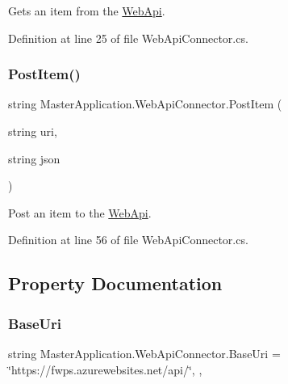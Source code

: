 Gets an item from the \mbox{\hyperlink{namespace_web_api}{Web\+Api}}. 



Definition at line 25 of file Web\+Api\+Connector.\+cs.

\mbox{\label{class_master_application_1_1_web_api_connector_aa75d6d9b09024ecdafe0c5b2b5911505}} 
\subsubsection{\texorpdfstring{Post\+Item()}{PostItem()}}
{\footnotesize\ttfamily string Master\+Application.\+Web\+Api\+Connector.\+Post\+Item (\begin{DoxyParamCaption}\item[{string}]{uri,  }\item[{string}]{json }\end{DoxyParamCaption})}



Post an item to the \mbox{\hyperlink{namespace_web_api}{Web\+Api}}. 



Definition at line 56 of file Web\+Api\+Connector.\+cs.



\subsection{Property Documentation}
\mbox{\label{class_master_application_1_1_web_api_connector_adada9c227fb19e053af688062d548010}} 
\subsubsection{\texorpdfstring{Base\+Uri}{BaseUri}}
{\footnotesize\ttfamily string Master\+Application.\+Web\+Api\+Connector.\+Base\+Uri = \char`\"{}https\+://fwps.\+azurewebsites.\+net/api/\char`\"{}\hspace{0.3cm}{\ttfamily [static]}, {\ttfamily [get]}, {\ttfamily [set]}}



